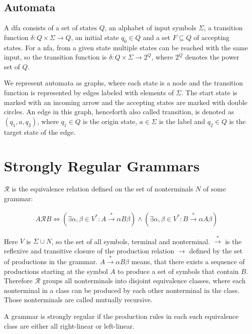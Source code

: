 \subsection{Automata}

A \acf{dfa} consists of a set of states $Q$, an alphabet of input symbols $\Sigma$, a transition function $\delta: Q \times \Sigma \rightarrow Q$, an initial state $q_0 \in Q$ and a set $F \subseteq Q$ of accepting states.
For a \acf{nfa}, from a given state multiple states can be reached with the same input, so the transition function is  $\delta: Q \times \Sigma \rightarrow 2^Q$, where $2^Q$ denotes the power set of $Q$.

We represent automata as graphs, where each state is a node and the transition function is represented by edges labeled with elements of $\Sigma$. The start state is marked with an incoming arrow and the accepting states are marked with double circles.
An edge in this graph, henceforth also called transition, is denoted as $(q_1, a, q_2)$, where $q_1 \in Q$ is the origin state, $a \in \Sigma$ is the label and $q_2 \in Q$ is the target state of the edge.

\section{Strongly Regular Grammars}\label{sec:background:srg}

$\mathcal{R}$ is the equivalence relation defined on the set of nonterminals $N$ of some grammar:

\begin{align}
	A \mathcal{R} B \Leftrightarrow (\exists \alpha, \beta \in V^* : A \xrightarrow{*} \alpha B \beta) \land (\exists \alpha, \beta \in V^* : B \xrightarrow{*} \alpha A \beta) 
\end{align}

Here $V$ is $\Sigma \cup N$, so the set of all symbols, terminal and nonterminal. $\xrightarrow{*}$ is the reflexive and transitive closure of the production relation $\rightarrow$ defined by the set of productions in the grammar. $A \xrightarrow{*} \alpha B \beta$ means, that there exists a sequence of productions starting at the symbol $A$ to produce a set of symbols that contain $B$. Therefore $\mathcal{R}$ groups all nonterminals into disjoint equivalence classes, where each nonterminal in a class can be produced by each other nonterminal in the class. Those nonterminals are called mutually recursive.

A grammar is strongly regular if the production rules in each such equivalence class are either all right-linear or left-linear.

